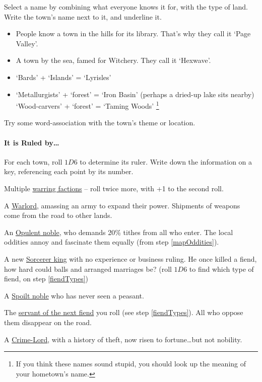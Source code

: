 \begin{multicols}{2}
Select a name by combining what everyone knows it for, with the type of
land.
Write the town's name next to it, and underline it.

\begin{itemize}
  \item
  People know a town in the hills for its library. That's why they call
  it `Page Valley'.
  \item
  A town by the sea, famed for Witchery.
  They call it `Hexwave'.
  \item
  `Bards' + `Islands' = `Lyrisles'
  \item
  \ifodd\value{r4}
    `Metallurgists' + `forest' = `Iron Basin' (perhaps a dried-up lake sits nearby)
  \else
    `Wood-carvers' + `forest' = `Taming Woods'%
  \fi
  \footnote{If you think these names sound stupid, you should look up the meaning of your hometown's name.}
\end{itemize}

Try some word-association with the town's theme or location.

\paragraph{It is Ruled by\ldots{}}

For each town, roll $1D6$ to determine its ruler.
Write down the information on a key, referencing each point by its number.

\begin{dlist}
  \item
  Multiple \underline{warring factions} -- roll twice more, with +1 to the second roll.
  \item
  A \underline{Warlord}, amassing an army to expand their power.
  Shipments of weapons come from the road to other lands.
  \item
  An \underline{Opulent noble}, who demands 20\% tithes from all who enter.
  The local oddities annoy and fascinate them equally (from step \ref{mapOddities}).
  \item
  A new \underline{Sorcerer king} with no experience or business ruling.
  He once killed a fiend, how hard could balls and arranged marriages be?
  (roll $1D6$ to find which type of fiend, on step \ref{fiendTypes})
  \item
  A \underline{Spoilt noble} who has never seen a peasant.
  \item
  The \underline{servant of the next fiend} you roll (see step \ref{fiendTypes}).
  All who oppose them disappear on the road.
  \item
  A \underline{Crime-Lord}, with a history of theft, now risen to fortune\ldots but not nobility.


\end{dlist}
\end{multicols}
